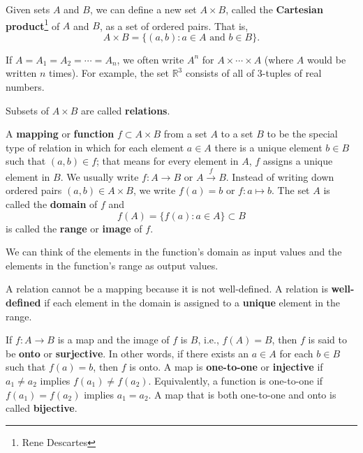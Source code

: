 \begin{definition}
Given sets $A$ and $B$, we can define a new set $A \times B$, called the \textbf{Cartesian product}\footnote{Rene Descartes} of $A$ and $B$, as a set of ordered pairs.  That is,
$$
A \times B = \{ (a,b) : a \in A \text{ and } b \in B \}.
$$
\end{definition}

If $A = A_1 = A_2 = \cdots = A_n$, we often write $A^n$ for $A \times \cdots \times A$ (where $A$ would be written $n$ times).   For example, the set ${\mathbb R}^3$ consists of all of 3-tuples of real numbers.
\begin{definition}
Subsets of $A \times B$ are called \textbf{relations}.
\end{definition}
\begin{definition}
A \textbf{mapping} or \textbf{function} $f \subset A \times B$ from a set $A$ to a set $B$ to be the special type of  relation in which for each element $a \in A$ there is a unique element $b \in B$ such that $(a, b) \in f$; that means for every element in $A$, $f$ assigns a unique element in $B$.  We usually write $f:A \rightarrow B$ or $A \stackrel{f}{\rightarrow} B$.  Instead of writing down ordered pairs  $(a,b) \in A \times B$, we write $f(a) = b$ or $f : a \mapsto b$.  The set  $A$ is called the \textbf{domain} of $f$ and
\[
f(A) = \{ f(a) : a \in A \} \subset B
\]
is called the \textbf{range} or \textbf{image} of $f$.
\end{definition}
We can think of the elements in the function's domain as input values and the elements in the function's range as output values.

A relation cannot be a mapping because it is not well-defined. A relation is \textbf{well-defined} if each element in the domain is assigned to a \textbf{unique} element in the range.

If $f:A \rightarrow B$ is a map and the image of $f$ is $B$, i.e., $f(A) = B$, then $f$ is said to be \textbf{onto} or \textbf{surjective}. In other words, if there exists an $a \in A$ for each $b \in B$ such that $f(a) = b$, then $f$ is onto. A map is \textbf{one-to-one} or \textbf{injective} if $a_1 \neq a_2$ implies $f(a_1) \neq f(a_2)$.  Equivalently, a function is one-to-one if $f(a_1) = f(a_2)$ implies $a_1 = a_2$.  A map that is both one-to-one and onto is called \textbf{bijective}.


